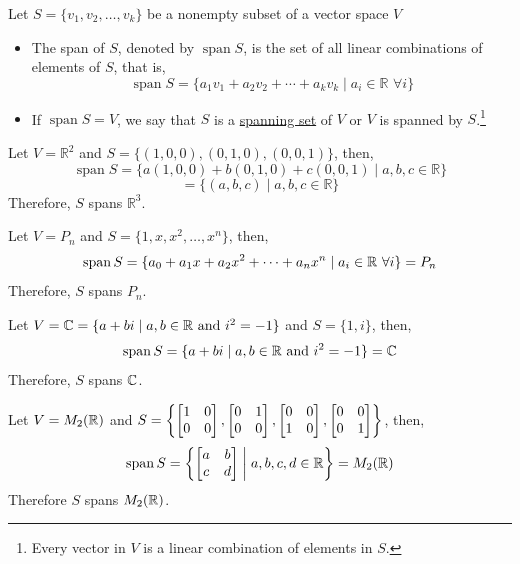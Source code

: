 \begin{definition}
Let $S = \{v_1, v_2, \dots, v_k\}$ be a nonempty subset of a vector space $V$
\begin{itemize}
    \item The span of $S$, denoted by $\operatorname{span} S$, is the set of all linear combinations of elements of $S$, that is,
    $$\operatorname{span} S = \{a_1v_1 + a_2v_2 + \cdots + a_kv_k \mid a_i \in \mathbb{R}\,\, \forall i\}$$
    \item If $\operatorname{span} S = V$, we say that $S$ is a \underline{spanning set} of $V$ or $V$ is spanned by $S$.\footnote{Every vector in $V$ is a linear combination of elements in $S$.}
\end{itemize}
\end{definition}

\begin{example}
Let $V = \mathbb{R}^2$ and $S = \{(1, 0, 0), (0, 1, 0), (0, 0, 1)\}$, then,
$$\operatorname{span}S = \{a(1,0, 0) + b(0, 1, 0) + c(0, 0, 1) \mid a, b, c \in \mathbb{R}\}$$
$$=\{(a, b, c) \mid a, b, c \in \mathbb{R}\}$$
Therefore, $S$ spans $\mathbb{R}^3$.
\end{example}

\begin{example}
Let $V = P_n$ and $S = \{1, x, x^2, \dots, x^n\}$, then,
$$\operatorname{span} S = \{a_0 + a_1x + a_2x^2 + \cdots + a_nx^n \mid a_i \in \mathbb{R}\,\, \forall i\} = P_n$$
Therefore, $S$ spans $P_n$.
\end{example}

\begin{example}
Let $V = \mathbb{C} = \{a + bi \mid a, b \in \mathbb{R}\,\,\text{and}\,\,i^2 = -1\}$ and $S = \{1, i\}$, then,
$$\operatorname{span}S = \{a + bi \mid a, b \in \mathbb{R}\,\,\text{and}\,\,i^2 = -1\} = \mathbb{C}$$
Therefore, $S$ spans $\mathbb{C}$.
\end{example}

\begin{example}
Let $V = M_2(\mathbb{R})$ and $S = \left\{\begin{bmatrix} 1 & 0 \\ 0 & 0 \end{bmatrix}, \begin{bmatrix}  0 & 1 \\ 0 & 0 \end{bmatrix}, \begin{bmatrix} 0 & 0 \\ 1 & 0 \end{bmatrix}, \begin{bmatrix} 0 & 0 \\ 0 & 1 \end{bmatrix}\right\}$, then,
$$\operatorname{span}S = \left\{\bmat{a & b \\ c & d} \suchthat a,b, c, d \in \RR \right\} = M_2(\RR)$$
Therefore $S$ spans $M_2(\mathbb{R})$.
\end{example}

